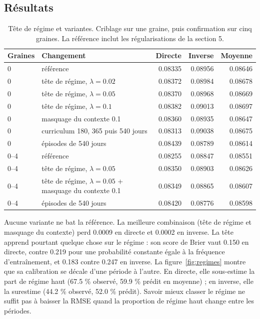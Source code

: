 \documentclass[11pt,a4paper]{article}
\begin{document}
\subsection{Résultats}

\begin{table}[!htb]
\centering\small
\caption{Tête de régime et variantes. Criblage sur une graine, puis confirmation sur cinq graines. La référence inclut les régularisations de la section 5.}
\label{tab:regimes}
\begin{tabularx}{\linewidth}{l X r r r}
\toprule
Graines & Changement & Directe & Inverse & Moyenne \\
\midrule
0 & référence & 0.08335 & 0.08956 & 0.08646 \\
0 & tête de régime, $\lambda = 0.02$ & 0.08372 & 0.08984 & 0.08678 \\
0 & tête de régime, $\lambda = 0.05$ & 0.08370 & 0.08968 & 0.08669 \\
0 & tête de régime, $\lambda = 0.1$ & 0.08382 & 0.09013 & 0.08697 \\
0 & masquage du contexte 0.1 & 0.08360 & 0.08935 & 0.08647 \\
0 & curriculum 180, 365 puis 540 jours & 0.08313 & 0.09038 & 0.08675 \\
0 & épisodes de 540 jours & 0.08439 & 0.08789 & 0.08614 \\
\midrule
0--4 & référence & 0.08255 & 0.08847 & 0.08551 \\
0--4 & tête de régime, $\lambda = 0.05$ & 0.08350 & 0.08903 & 0.08626 \\
0--4 & tête de régime, $\lambda = 0.05$ + masquage du contexte 0.1 & 0.08349 & 0.08865 & 0.08607 \\
0--4 & épisodes de 540 jours & 0.08420 & 0.08776 & 0.08598 \\
\bottomrule
\end{tabularx}
\end{table}

Aucune variante ne bat la référence. La meilleure combinaison (tête de régime et masquage du contexte) perd 0.0009 en directe et 0.0002 en inverse. La tête apprend pourtant quelque chose sur le régime : son score de Brier vaut 0.150 en directe, contre 0.219 pour une probabilité constante égale à la fréquence d'entraînement, et 0.183 contre 0.247 en inverse. La figure~\ref{fig:regimes} montre que sa calibration se décale d'une période à l'autre. En directe, elle sous-estime la part de régime haut (67.5 \% observé, 59.9 \% prédit en moyenne) ; en inverse, elle la surestime (44.2 \% observé, 52.0 \% prédit). Savoir mieux classer le régime ne suffit pas à baisser la RMSE quand la proportion de régime haut change entre les périodes.
\end{document}
